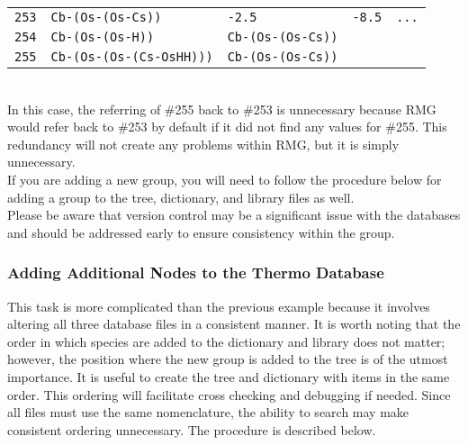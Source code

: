 \documentclass[12pt,letterpaper]{article}
\begin{document}
\begin{tabular}{lllll}
\texttt{253} & \texttt{Cb-(Os-(Os-Cs))} & \texttt{-2.5} & \texttt{-8.5} & \texttt{...} \\
\texttt{254} & \texttt{Cb-(Os-(Os-H))} & \texttt{Cb-(Os-(Os-Cs))} & \\
\texttt{255} & \texttt{Cb-(Os-(Os-(Cs-OsHH)))} & \texttt{Cb-(Os-(Os-Cs))} & \\
\end{tabular} \\


In this case, the referring of \#255 back to \#253 is unnecessary because
RMG would refer back to \#253 by default if it did not find any values for
\#255. This redundancy will not create any problems within RMG, but it is
simply unnecessary.\\

If you are adding a new group, you will need to follow the procedure
below for adding a group to the tree, dictionary, and library files as well.\\

Please be aware that version control may be a significant issue with the databases and should
be addressed early to ensure consistency within the group.

\subsubsection{Adding Additional Nodes to the Thermo Database}

This task is more complicated than the previous example because it involves altering all three database
files in a consistent manner. It is worth noting that the order in which
species are added to the dictionary and library does not matter; however,
the position where the new group is added to the tree is of the utmost
importance. It is useful to create the tree and dictionary with items in the
same order.  This ordering will facilitate cross checking and debugging if needed. Since all
files must use the same nomenclature, the ability to search may make consistent
ordering unnecessary. The procedure is described below.\\
\end{document}
